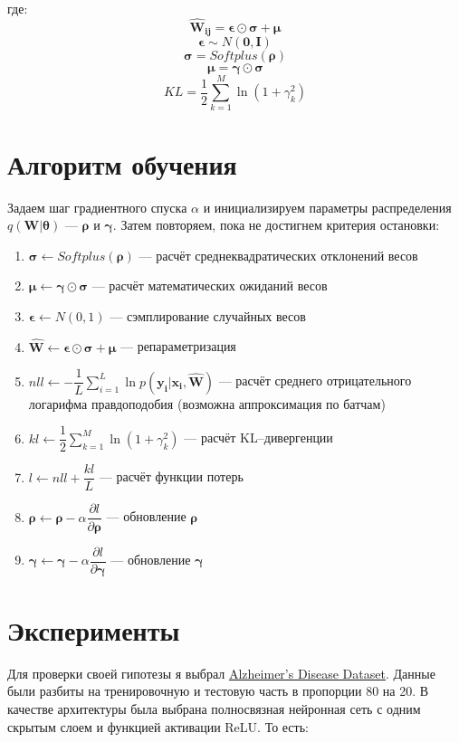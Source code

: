 \documentclass{article}
\begin{document}
где:
\[
 \pmb{\hat{W}_{ij}} = \pmb{\epsilon} \odot \pmb{\sigma} + \pmb{\mu}
\]
\[
 \pmb{\epsilon} \sim N(\pmb{0}, \pmb{I})
\]
\[
 \pmb{\sigma} = Softplus(\pmb{\rho})
\]
\[
 \pmb{\mu} = \pmb{\gamma} \odot \pmb{\sigma}
\]
\[
 KL = \dfrac{1}{2}\sum_{k=1}^{M}\ln({1 + \gamma_{k}^{2}})
\]

\section{Алгоритм обучения}

Задаем шаг градиентного спуска $\alpha$ и инициализируем параметры распределения $q(\pmb{W} | \pmb{\theta})$ — $\pmb{\rho}$ и $\pmb{\gamma}$. Затем повторяем, пока не достигнем критерия остановки:
\begin{enumerate}
    \item $\pmb{\sigma} \leftarrow Softplus(\pmb{\rho})$ --- расчёт среднеквадратических отклонений весов
    \item $\pmb{\mu} \leftarrow \pmb{\gamma} \odot \pmb{\sigma}$ --- расчёт математических ожиданий весов
    \item $\pmb{\epsilon} \leftarrow N(0, 1)$ --- сэмплирование случайных весов
    \item $\hat{\pmb{W}} \leftarrow \pmb{\epsilon} \odot \pmb{\sigma} + \pmb{\mu}$ --- репараметризация
    \item $nll \leftarrow -\dfrac{1}{L}\sum_{i=1}^{L}{\ln{p( \pmb{y_{i}} | \pmb{x_{i}}, \pmb{\hat{W}})}}$ --- расчёт среднего отрицательного логарифма правдоподобия (возможна аппроксимация по батчам)
    \item $kl \leftarrow \dfrac{1}{2}\sum_{k=1}^{M}\ln({1 + \gamma_{k}^{2}})$ --- расчёт KL--дивергенции
    \item $l \leftarrow nll + \dfrac{kl}{L}$ --- расчёт функции потерь
    \item $\pmb{\rho} \leftarrow \pmb{\rho} - \alpha \dfrac{\partial l}{\partial \pmb{\rho}}$ --- обновление $\pmb{\rho}$
    \item $\pmb{\gamma} \leftarrow \pmb{\gamma} - \alpha \dfrac{\partial l}{\partial \pmb{\gamma}}$ --- обновление $\pmb{\gamma}$
\end{enumerate}

\section{Эксперименты}

Для проверки своей гипотезы я выбрал \href{https://www.kaggle.com/datasets/rabieelkharoua/alzheimers-disease-dataset}{Alzheimer's Disease Dataset}. Данные были разбиты на тренировочную и тестовую часть в пропорции 80 на 20. В качестве архитектуры была выбрана полносвязная нейронная сеть с одним скрытым слоем и функцией активации ReLU. То есть:
\end{document}
